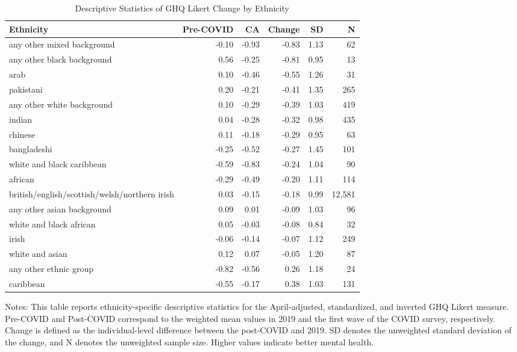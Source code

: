 \begin{table}[htbp]
\centering
\caption{Descriptive Statistics of GHQ Likert Change by Ethnicity}
\label{tab:desc_ethnicity_ghq}
\begin{threeparttable}
\footnotesize
\begin{tabular*}{\textwidth}{@{\extracolsep{\fill}}p{5.2cm}rrrrr}
\toprule
Ethnicity & Pre-COVID & CA & Change & SD & N \\
\midrule
any other mixed background & -0.10 & -0.93 & -0.83 & 1.13 & 62 \\
any other black background & 0.56 & -0.25 & -0.81 & 0.95 & 13 \\
arab & 0.10 & -0.46 & -0.55 & 1.26 & 31 \\
pakistani & 0.20 & -0.21 & -0.41 & 1.35 & 265 \\
any other white background & 0.10 & -0.29 & -0.39 & 1.03 & 419 \\
indian & 0.04 & -0.28 & -0.32 & 0.98 & 435 \\
chinese & 0.11 & -0.18 & -0.29 & 0.95 & 63 \\
bangladeshi & -0.25 & -0.52 & -0.27 & 1.45 & 101 \\
white and black caribbean & -0.59 & -0.83 & -0.24 & 1.04 & 90 \\
african & -0.29 & -0.49 & -0.20 & 1.11 & 114 \\
british/english/scottish/welsh/northern irish & 0.03 & -0.15 & -0.18 & 0.99 & 12,581 \\
any other asian background & 0.09 & 0.01 & -0.09 & 1.03 & 96 \\
white and black african & 0.05 & -0.03 & -0.08 & 0.84 & 32 \\
irish & -0.06 & -0.14 & -0.07 & 1.12 & 249 \\
white and asian & 0.12 & 0.07 & -0.05 & 1.20 & 87 \\
any other ethnic group & -0.82 & -0.56 & 0.26 & 1.18 & 24 \\
caribbean & -0.55 & -0.17 & 0.38 & 1.03 & 131 \\
\bottomrule
\end{tabular*}
\begin{tablenotes}[flushleft]
\footnotesize
\item Notes: This table reports ethnicity-specific descriptive statistics for the April-adjusted, standardized, and inverted GHQ Likert measure. Pre-COVID and Post-COVID correspond to the weighted mean values in 2019 and the first wave of the COVID survey, respectively. Change is defined as the individual-level difference between the post-COVID and 2019. SD denotes the unweighted standard deviation of the change, and N denotes the unweighted sample size. Higher values indicate better mental health.
\end{tablenotes}
\end{threeparttable}
\end{table}